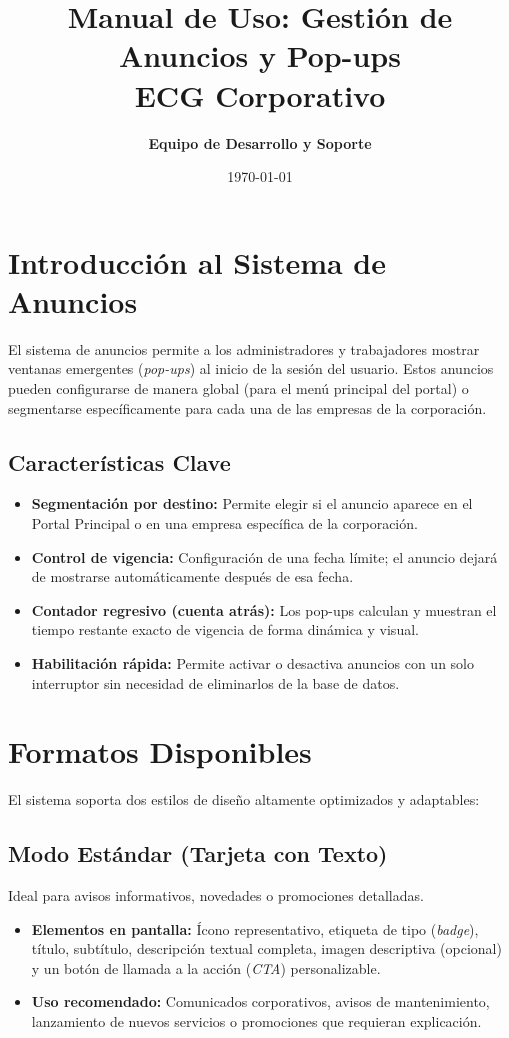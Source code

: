 \documentclass[11pt,a4paper]{article}
\title{\textbf{Manual de Uso: Gestión de Anuncios y Pop-ups\\ ECG Corporativo}}
\author{\textbf{Equipo de Desarrollo y Soporte}}
\date{\today}
\begin{document}
\maketitle
\tableofcontents
\newpage

\section{Introducción al Sistema de Anuncios}
El sistema de anuncios permite a los administradores y trabajadores mostrar ventanas emergentes (\textit{pop-ups}) al inicio de la sesión del usuario. Estos anuncios pueden configurarse de manera global (para el menú principal del portal) o segmentarse específicamente para cada una de las empresas de la corporación.

\subsection{Características Clave}
\begin{itemize}
    \item \textbf{Segmentación por destino:} Permite elegir si el anuncio aparece en el Portal Principal o en una empresa específica de la corporación.
    \item \textbf{Control de vigencia:} Configuración de una fecha límite; el anuncio dejará de mostrarse automáticamente después de esa fecha.
    \item \textbf{Contador regresivo (cuenta atrás):} Los pop-ups calculan y muestran el tiempo restante exacto de vigencia de forma dinámica y visual.
    \item \textbf{Habilitación rápida:} Permite activar o desactiva anuncios con un solo interruptor sin necesidad de eliminarlos de la base de datos.
\end{itemize}

\section{Formatos Disponibles}
El sistema soporta dos estilos de diseño altamente optimizados y adaptables:

\subsection{Modo Estándar (Tarjeta con Texto)}
Ideal para avisos informativos, novedades o promociones detalladas.
\begin{itemize}
    \item \textbf{Elementos en pantalla:} Ícono representativo, etiqueta de tipo (\textit{badge}), título, subtítulo, descripción textual completa, imagen descriptiva (opcional) y un botón de llamada a la acción (\textit{CTA}) personalizable.
    \item \textbf{Uso recomendado:} Comunicados corporativos, avisos de mantenimiento, lanzamiento de nuevos servicios o promociones que requieran explicación.
\end{itemize}
\end{document}
